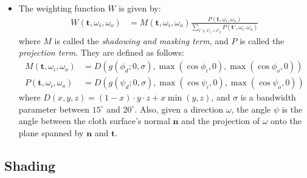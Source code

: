 \documentclass[10pt]{article}
\newcommand{\ve}[1]{\mathbf{#1}}
\begin{document}
\begin{itemize}
    \item The weighting function $W$ is given by:
    \begin{align*}
      W(\ve{t}, \omega_i, \omega_o) &= M(\ve{t}, \omega_i, \omega_o) \frac{P(\ve{t},\omega_i,\omega_o)}{\sum_{t' \in C_1 \cup C_2} P(\ve{t'}, \omega_i, \omega_o)}
    \end{align*}
    where $M$ is called the \emph{shadowing and masking term}, and $P$ is called the \emph{projection term}.  They are defined as follows:
    \begin{align*}
      M(\ve{t},\omega_i,\omega_o) 
      &= D(g(\phi_d; 0, \sigma), \max(\cos\phi_i, 0), \max(\cos\phi_o, 0)) \\
      P(\ve{t}, \omega_i,\omega_o)
      &= D(g(\psi_d; 0, \sigma), \max(\cos\psi_i, 0), \max(\cos\psi_o, 0))      
    \end{align*}
    where $D(x,y,z) = (1-x) \cdot y \cdot z + x\min(y,z)$, and $\sigma$ is a bandwidth parameter between $15^\circ$ and $20^\circ$.  Also, given a direction $\omega$, the angle $\psi$ is the angle between the cloth surface's normal $\ve{n}$ and the projection of $\omega$ onto the plane spanned by $\ve{n}$ and $\ve{t}$.
  \end{itemize}

  \subsection{Shading}
\end{document}
